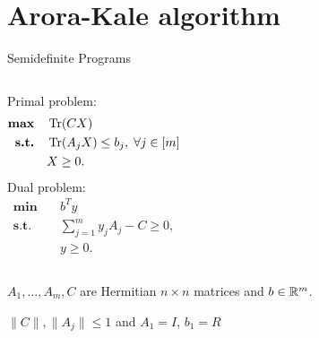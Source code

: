 
\section{Arora-Kale algorithm}

\begin{frame}{Semidefinite Programs}
 \begin{columns}
  Primal problem:
  \begin{align*}
    \textbf{max} & \quad \operatorname{Tr}(CX) \\
    \textbf{s.t.} & \quad \operatorname{Tr}(A_j X) \leq b_j,\;\forall j \in [m] \\
		      & \quad X \geq 0.
  \end{align*}
  Dual problem:
  \begin{align*}
    \textbf{min} & \quad b^T y \\
    \textbf{s.t.} & \quad \sum_{j=1}^m y_j A_j - C \geq 0, \\
		      & \quad y \geq 0.
  \end{align*}
 \end{columns}
 
 \vspace{2\floatsep}
 
 $A_1,\dots,A_m,C$ are Hermitian $n\times n$ matrices and $b\in\mathbb{R}^m$.
 
 \vspace{2\floatsep}
 
  $\|C\|, \|A_j\| \leq 1$ and $A_1 = I$, $b_1 = R$
\end{frame}


